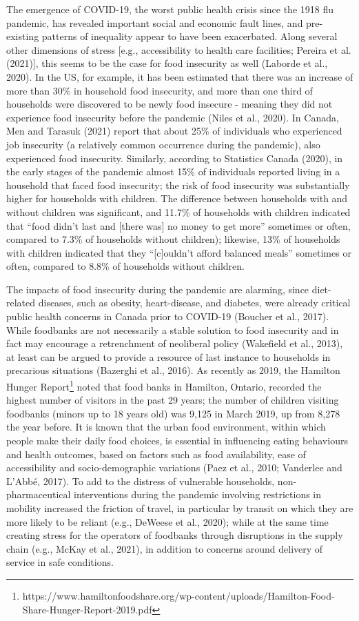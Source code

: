 \documentclass[]{elsarticle} %
\begin{document}
The emergence of COVID-19, the worst public health crisis since the 1918
flu pandemic, has revealed important social and economic fault lines,
and pre-existing patterns of inequality appear to have been exacerbated.
Along several other dimensions of stress {[}e.g., accessibility to
health care facilities; Pereira et al. (2021){]}, this seems to be the
case for food insecurity as well (Laborde et al., 2020). In the US, for
example, it has been estimated that there was an increase of more than
30\% in household food insecurity, and more than one third of households
were discovered to be newly food insecure - meaning they did not
experience food insecurity before the pandemic (Niles et al., 2020). In
Canada, Men and Tarasuk (2021) report that about 25\% of individuals who
experienced job insecurity (a relatively common occurrence during the
pandemic), also experienced food insecurity. Similarly, according to
Statistics Canada (2020), in the early stages of the pandemic almost
15\% of individuals reported living in a household that faced food
insecurity; the risk of food insecurity was substantially higher for
households with children. The difference between households with and
without children was significant, and 11.7\% of households with children
indicated that ``food didn't last and {[}there was{]} no money to get
more'' sometimes or often, compared to 7.3\% of households without
children); likewise, 13\% of households with children indicated that
they ``{[}c{]}ouldn't afford balanced meals'' sometimes or often,
compared to 8.8\% of households without children.

The impacts of food insecurity during the pandemic are alarming, since
diet-related diseases, such as obesity, heart-disease, and diabetes,
were already critical public health concerns in Canada prior to COVID-19
(Boucher et al., 2017). While foodbanks are not necessarily a stable
solution to food insecurity and in fact may encourage a retrenchment of
neoliberal policy (Wakefield et al., 2013), at least can be argued to
provide a resource of last instance to households in precarious
situations (Bazerghi et al., 2016). As recently as 2019, the Hamilton
Hunger Report\footnote{https://www.hamiltonfoodshare.org/wp-content/uploads/Hamilton-Food-Share-Hunger-Report-2019.pdf}
noted that food banks in Hamilton, Ontario, recorded the highest number
of visitors in the past 29 years; the number of children visiting
foodbanks (minors up to 18 years old) was 9,125 in March 2019, up from
8,278 the year before. It is known that the urban food environment,
within which people make their daily food choices, is essential in
influencing eating behaviours and health outcomes, based on factors such
as food availability, ease of accessibility and socio-demographic
variations (Paez et al., 2010; Vanderlee and L'Abbé, 2017). To add to
the distress of vulnerable households, non-pharmaceutical interventions
during the pandemic involving restrictions in mobility increased the
friction of travel, in particular by transit on which they are more
likely to be reliant (e.g., DeWeese et al., 2020); while at the same
time creating stress for the operators of foodbanks through disruptions
in the supply chain (e.g., McKay et al., 2021), in addition to concerns
around delivery of service in safe conditions.
\end{document}
